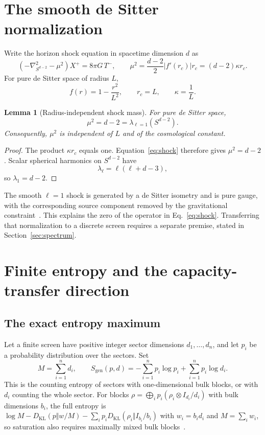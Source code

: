\documentclass[11pt]{article}
\newtheorem{lemma}[theorem]{Lemma}
\theoremstyle{remark}
\newcommand{\KL}{D_{\mathrm{KL}}}
\begin{document}
\section{The smooth de Sitter normalization}

Write the horizon shock equation in spacetime dimension \(d\) as
\begin{equation}
\left(-\nabla^2_{S^{d-2}}-\mu^2\right)X^+
=8\pi G\,T^-,
\qquad
\mu^2=\frac{d-2}{2}|f'(r_c)|r_c=(d-2)\kappa r_c .
\label{eq:shock}
\end{equation}
For pure de Sitter space of radius \(L\),
\[
f(r)=1-\frac{r^2}{L^2},
\qquad
r_c=L,
\qquad
\kappa=\frac1L.
\]

\begin{lemma}[Radius-independent shock mass]
\label{lem:mu2}
For pure de Sitter space,
\[
\mu^2=d-2=\lambda_{\ell=1}\!\left(S^{d-2}\right).
\]
Consequently, \(\mu^2\) is independent of \(L\) and of the cosmological
constant.
\end{lemma}

\begin{proof}
The product \(\kappa r_c\) equals one. Equation~\eqref{eq:shock} therefore
gives \(\mu^2=d-2\). Scalar spherical harmonics on \(S^{d-2}\) have
\[
\lambda_\ell=\ell(\ell+d-3),
\]
so \(\lambda_1=d-2\).
\end{proof}

The smooth \(\ell=1\) shock is generated by a de Sitter isometry and is pure
gauge, with the corresponding source component removed by the gravitational
constraint~\cite{chenStanfordTangYang2026}. This explains the zero of the
operator in Eq.~\eqref{eq:shock}. Transferring that normalization to a
discrete screen requires a separate premise, stated in
Section~\ref{sec:spectrum}.

\section{Finite entropy and the capacity-transfer direction}

\subsection{The exact entropy maximum}

Let a finite screen have positive integer sector dimensions
\(d_1,\ldots,d_n\), and let \(p_i\) be a probability distribution over the
sectors. Set
\[
M=\sum_{i=1}^n d_i,
\qquad
S_{\mathrm{gen}}(p,d)
=-\sum_{i=1}^n p_i\log p_i+\sum_{i=1}^n p_i\log d_i.
\]
This is the counting entropy of sectors with one-dimensional bulk blocks, or
with \(d_i\) counting the whole sector. For blocks
\(\rho=\bigoplus_ip_i(\rho_i\otimes I_{d_i}/d_i)\) with bulk dimensions
\(b_i\), the full entropy is
\(\log M-\KL(p\Vert w/M)-\sum_ip_i\KL(\rho_i\Vert I_{b_i}/b_i)\) with
\(w_i=b_id_i\) and \(M=\sum_iw_i\), so saturation also requires maximally
mixed bulk blocks~\cite{ophentropy}.
\end{document}
